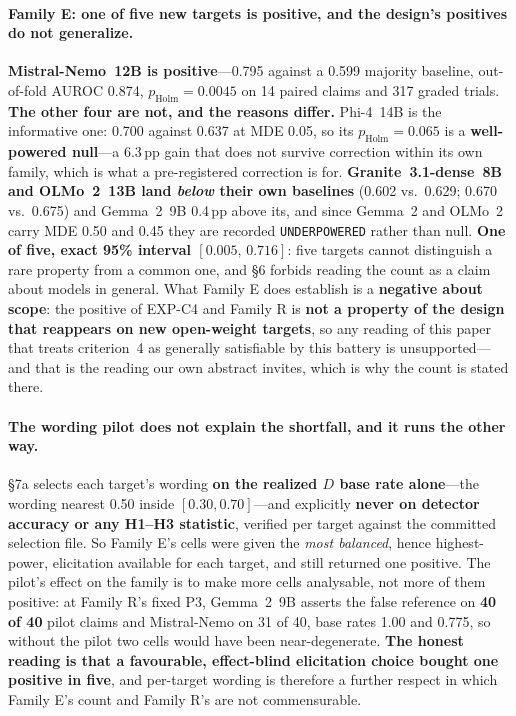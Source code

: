 \paragraph{Family E: one of five new targets is positive, and the design's positives do not generalize.} \textbf{Mistral-Nemo~12B is positive}---0.795 against a 0.599 majority baseline, out-of-fold AUROC 0.874, $p_{\mathrm{Holm}}\!=\!0.0045$ on 14 paired claims and 317 graded trials. \textbf{The other four are not, and the reasons differ.} Phi-4~14B is the informative one: 0.700 against 0.637 at MDE 0.05, so its $p_{\mathrm{Holm}}\!=\!0.065$ is a \textbf{well-powered null}---a 6.3\,pp gain that does not survive correction within its own family, which is what a pre-registered correction is for. \textbf{Granite~3.1-dense~8B and OLMo~2~13B land \emph{below} their own baselines} (0.602 vs.\ 0.629; 0.670 vs.\ 0.675) and Gemma~2~9B 0.4\,pp above its, and since Gemma~2 and OLMo~2 carry MDE 0.50 and 0.45 they are recorded \texttt{UNDERPOWERED} rather than null. \textbf{One of five, exact 95\% interval $[0.005,\,0.716]$}: five targets cannot distinguish a rare property from a common one, and §6 forbids reading the count as a claim about models in general. What Family E does establish is a \textbf{negative about scope}: the positive of EXP-C4 and Family R is \textbf{not a property of the design that reappears on new open-weight targets}, so any reading of this paper that treats criterion~4 as generally satisfiable by this battery is unsupported---and that is the reading our own abstract invites, which is why the count is stated there.

\paragraph{The wording pilot does not explain the shortfall, and it runs the other way.} §7a selects each target's wording \textbf{on the realized $D$ base rate alone}---the wording nearest 0.50 inside $[0.30,0.70]$---and explicitly \textbf{never on detector accuracy or any H1--H3 statistic}, verified per target against the committed selection file. So Family E's cells were given the \emph{most balanced}, hence highest-power, elicitation available for each target, and still returned one positive. The pilot's effect on the family is to make more cells analysable, not more of them positive: at Family R's fixed P3, Gemma~2~9B asserts the false reference on \textbf{40 of 40} pilot claims and Mistral-Nemo on 31 of 40, base rates 1.00 and 0.775, so without the pilot two cells would have been near-degenerate. \textbf{The honest reading is that a favourable, effect-blind elicitation choice bought one positive in five}, and per-target wording is therefore a further respect in which Family E's count and Family R's are not commensurable.

